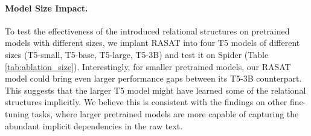 \documentclass[11pt]{article}
\begin{document}
\begin{table}
\caption{Ablation study on the relative contribution of different relation types. Experiment are conducted using RASAT(-3B) on the SParC dataset. ``Dp'' is short for dependency relation, ``Cf'' for coreference relation, ``SL'' for schema linking relation, ``SE'' for schema encoding relation and ``Db'' means database content.}
\label{tab:sparc_relation_ablation}
\end{table}

\paragraph{Model Size Impact.} 
To test the effectiveness of the introduced relational structures on pretrained models with different sizes, we implant RASAT into four T5 models of different sizes (T5-small, T5-base, T5-large, T5-3B) and test it on Spider (Table \ref{tab:ablation_size}). Interestingly, for smaller pretrained models, our RASAT model could bring even larger performance gaps between its T5-3B counterpart. This suggests that the larger T5 model might have learned some of the relational structures implicitly. We believe this is consistent with the findings on other fine-tuning tasks, where larger pretrained models are more capable of capturing the abundant implicit dependencies in the raw text.
\end{document}
